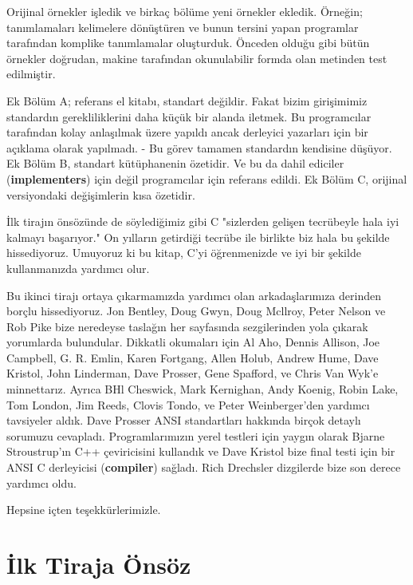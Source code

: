\documentclass[a4paper,12pt,oneside]{book}
\begin{document}
\thispagestyle{preface} \noindent Orijinal örnekler işledik ve birkaç bölüme yeni örnekler ekledik. Örneğin; tanımlamaları kelimelere dönüştüren ve bunun tersini yapan programlar tarafından komplike tanımlamalar oluşturduk. Önceden olduğu gibi bütün örnekler doğrudan, makine tarafından okunulabilir formda olan metinden test edilmiştir.
\par Ek Bölüm A; referans el kitabı, standart değildir. Fakat bizim girişimimiz standardın gerekliliklerini daha küçük bir alanda iletmek. Bu programcılar tarafından kolay anlaşılmak üzere yapıldı ancak derleyici yazarları için bir açıklama olarak yapılmadı. - Bu görev tamamen standardın kendisine düşüyor. Ek Bölüm B, standart kütüphanenin özetidir. Ve bu da dahil ediciler (\textbf{implementers}) için değil programcılar için referans edildi. Ek Bölüm C, orijinal versiyondaki değişimlerin kısa özetidir.
\par İlk tirajın önsözünde de söylediğimiz gibi C "sizlerden gelişen tecrübeyle hala iyi kalmayı başarıyor." On yılların getirdiği tecrübe ile birlikte biz hala bu şekilde hissediyoruz. Umuyoruz ki bu kitap, C'yi öğrenmenizde ve iyi bir şekilde kullanmanızda yardımcı olur.
\par Bu ikinci tirajı ortaya çıkarmamızda yardımcı olan arkadaşlarımıza derinden borçlu hissediyoruz.  Jon Bentley, Doug Gwyn, Doug Mcllroy, Peter Nelson ve Rob Pike bize neredeyse taslağın her sayfasında sezgilerinden yola çıkarak yorumlarda bulundular. Dikkatli okumaları için  Al Aho, Dennis Allison, Joe Campbell, G. R. Emlin, Karen Fortgang, Allen Holub, Andrew Hume, Dave Kristol, John Linderman, Dave Prosser, Gene Spafford, ve Chris Van Wyk'e minnettarız. Ayrıca  BHl Cheswick, Mark Kernighan, Andy Koenig, Robin Lake, Tom London, Jim Reeds, Clovis Tondo, ve Peter Weinberger'den yardımcı tavsiyeler aldık. Dave Prosser ANSI standartları hakkında birçok detaylı sorumuzu cevapladı. Programlarımızın yerel testleri için yaygın olarak  Bjarne Stroustrup'ın C++ çeviricisini kullandık ve Dave Kristol bize final testi için bir ANSI C derleyicisi (\textbf{compiler}) sağladı. Rich Drechsler dizgilerde bize son derece yardımcı oldu.
\par Hepsine içten teşekkürlerimizle.
\newline

\noindent \hspace*{270pt}{Brian W. Kernighan \\}
\hspace*{280pt}{Dennis M. Ritchie}

\chapter*{İlk Tiraja Önsöz}
\end{document}
